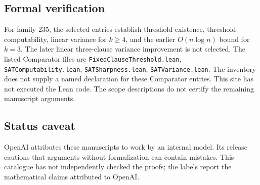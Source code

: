 \documentclass[11pt]{article}
\begin{document}
\subsection{Formal verification}
For family 235, the selected entries establish threshold existence, threshold computability, linear variance for $k\geq4$, and the earlier $O(n\log n)$ bound for $k=3$. The later linear three-clause variance improvement is not selected. The listed Comparator files are \texttt{FixedClauseThreshold.lean}, \texttt{SATComputability.lean}, \texttt{SATSharpness.lean}, \texttt{SATVariance.lean}. The inventory does not supply a named declaration for these Comparator entries. This site has not executed the Lean code. The scope descriptions do not certify the remaining manuscript arguments.

\subsection{Status caveat}
OpenAI attributes these manuscripts to work by an internal model. Its release cautions that arguments without formalization can contain mistakes. This catalogue has not independently checked the proofs; the labels report the mathematical claims attributed to OpenAI.
\end{document}
